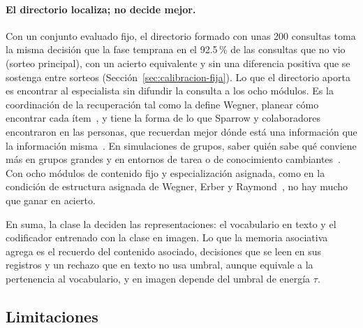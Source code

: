 \paragraph{El directorio localiza; no decide mejor.}
Con un conjunto evaluado fijo, el directorio formado con unas 200 consultas toma la
misma decisión que la fase temprana en el 92.5\,\% de las consultas que no vio (sorteo
principal), con un acierto equivalente y sin una diferencia positiva que se sostenga
entre sorteos (Sección~\ref{sec:calibracion-fija}).
Lo que el directorio aporta es encontrar al especialista sin difundir la consulta a los
ocho módulos.
Es la coordinación de la recuperación tal como la define Wegner, planear cómo encontrar
cada ítem~\cite{wegner1995computer}, y tiene la forma de lo que Sparrow y colaboradores
encontraron en las personas, que recuerdan mejor dónde está una información que la
información misma~\cite{sparrow2011google}.
En simulaciones de grupos, saber quién sabe qué conviene más en grupos grandes y en
entornos de tarea o de conocimiento cambiantes~\cite{ren2006contingent}.
Con ocho módulos de contenido fijo y especialización asignada, como en la condición de
estructura asignada de Wegner, Erber y Raymond~\cite{wegner1991transactive}, no hay
mucho que ganar en acierto.

En suma, la clase la deciden las representaciones: el vocabulario en texto y el
codificador entrenado con la clase en imagen.
Lo que la memoria asociativa agrega es el recuerdo del contenido asociado, decisiones que
se leen en sus registros y un rechazo que en texto no usa umbral, aunque equivale a la
pertenencia al vocabulario, y en imagen depende del umbral de energía $\tau$.

\subsection{Limitaciones}
\label{sec:limitaciones}

